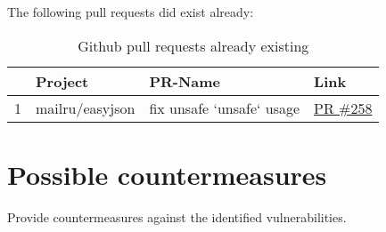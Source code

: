 The following pull requests did exist already:

\begin{table}[h]
    \centering
    \caption{Github pull requests already existing}
    \label{tbl:pull-requests-existing}
    \begin{tabular}{llll}
        \toprule
        {} & Project & PR-Name & Link \\
        \midrule
        1  & mailru/easyjson & fix unsafe `unsafe` usage & \href{https://github.com/mailru/easyjson/pull/258}{PR \#258} \\
        \bottomrule
    \end{tabular}
\end{table}



\section{Possible countermeasures}\label{sec:countermeasures}

Provide countermeasures against the identified vulnerabilities.
